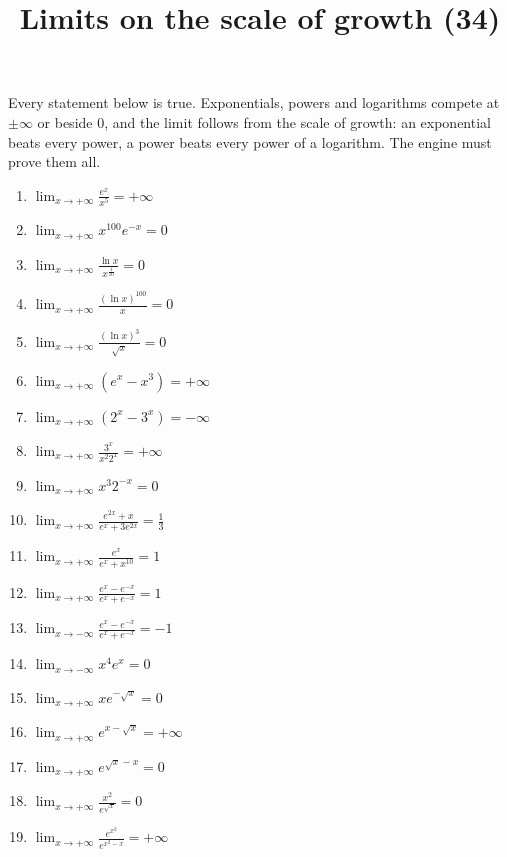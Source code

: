 \documentclass[11pt,a4paper]{article}
\title{Limits on the scale of growth (34)}
\author{}
\date{}
\begin{document}
\maketitle
Every statement below is true. Exponentials, powers and logarithms compete at $\pm\infty$ or beside $0$, and the limit follows from the scale of growth: an exponential beats every power, a power beats every power of a logarithm. The engine must prove them all.

\begin{enumerate}
\item $\displaystyle \lim_{x \to +\infty} \frac{e^{x}}{x^{5}} = +\infty$
\item $\displaystyle \lim_{x \to +\infty} x^{100} e^{-x} = 0$
\item $\displaystyle \lim_{x \to +\infty} \frac{\ln x}{x^{\frac{1}{10}}} = 0$
\item $\displaystyle \lim_{x \to +\infty} \frac{(\ln x)^{100}}{x} = 0$
\item $\displaystyle \lim_{x \to +\infty} \frac{(\ln x)^{3}}{\sqrt{x}} = 0$
\item $\displaystyle \lim_{x \to +\infty} \left(e^{x} - x^{3}\right) = +\infty$
\item $\displaystyle \lim_{x \to +\infty} \left(2^{x} - 3^{x}\right) = -\infty$
\item $\displaystyle \lim_{x \to +\infty} \frac{3^{x}}{x^{2} 2^{x}} = +\infty$
\item $\displaystyle \lim_{x \to +\infty} x^{3} 2^{-x} = 0$
\item $\displaystyle \lim_{x \to +\infty} \frac{e^{2x} + x}{e^{x} + 3e^{2x}} = \frac{1}{3}$
\item $\displaystyle \lim_{x \to +\infty} \frac{e^{x}}{e^{x} + x^{10}} = 1$
\item $\displaystyle \lim_{x \to +\infty} \frac{e^{x} - e^{-x}}{e^{x} + e^{-x}} = 1$
\item $\displaystyle \lim_{x \to -\infty} \frac{e^{x} - e^{-x}}{e^{x} + e^{-x}} = -1$
\item $\displaystyle \lim_{x \to -\infty} x^{4} e^{x} = 0$
\item $\displaystyle \lim_{x \to +\infty} x e^{-\sqrt{x}} = 0$
\item $\displaystyle \lim_{x \to +\infty} e^{x - \sqrt{x}} = +\infty$
\item $\displaystyle \lim_{x \to +\infty} e^{\sqrt{x} - x} = 0$
\item $\displaystyle \lim_{x \to +\infty} \frac{x^{2}}{e^{\sqrt{x}}} = 0$
\item $\displaystyle \lim_{x \to +\infty} \frac{e^{x^{2}}}{e^{x^{2} - x}} = +\infty$

\end{enumerate}
\end{document}
